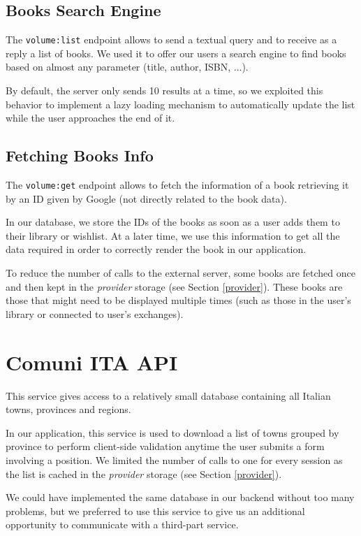 \subsection{Books Search Engine}
The \texttt{volume:list} endpoint allows to send a textual query and to receive as a reply a list of books.
We used it to offer our users a search engine to find books based on almost any parameter (title, author, ISBN, ...).

By default, the server only sends 10 results at a time, so we exploited this behavior to implement a lazy loading mechanism to automatically update the list while the user approaches the end of it.

\clearpage
\subsection{Fetching Books Info}
The \texttt{volume:get} endpoint allows to fetch the information of a book retrieving it by an ID given by Google (not directly related to the book data).

In our database, we store the IDs of the books as soon as a user adds them to their library or wishlist.
At a later time, we use this information to get all the data required in order to correctly render the book in our application.

To reduce the number of calls to the external server, some books are fetched once and then kept in the \textit{provider} storage (see Section \ref{provider}).
These books are those that might need to be displayed multiple times (such as those in the user's library or connected to user's exchanges).

\section{Comuni ITA API}
This service gives access to a relatively small database containing all Italian towns, provinces and regions.

In our application, this service is used to download a list of towns grouped by province to perform client-side validation anytime the user submits a form involving a position.
We limited the number of calls to one for every session as the list is cached in the \textit{provider} storage (see Section \ref{provider}).

We could have implemented the same database in our backend without too many problems, but we preferred to use this service to give us an additional opportunity to communicate with a third-part service.

